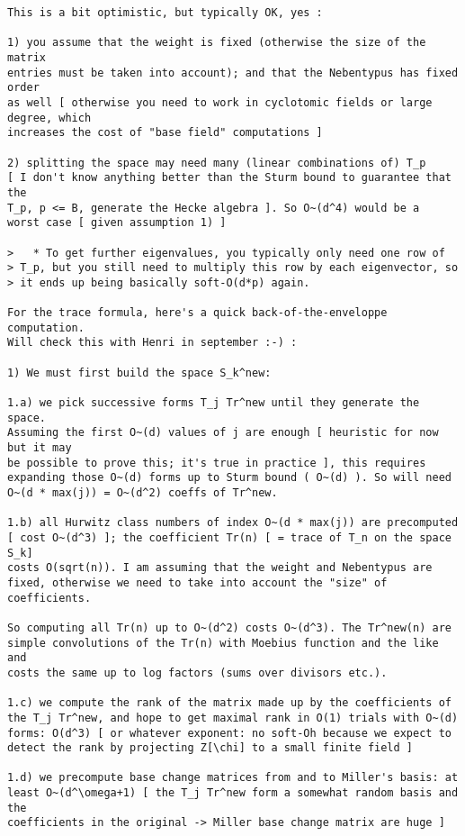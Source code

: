 \documentclass[11pt]{amsart}
\numberwithin{equation}{subsection}
\theoremstyle{plain}
\theoremstyle{definition}
\begin{document}
\begin{verbatim}
This is a bit optimistic, but typically OK, yes :

1) you assume that the weight is fixed (otherwise the size of the matrix
entries must be taken into account); and that the Nebentypus has fixed order
as well [ otherwise you need to work in cyclotomic fields or large degree, which
increases the cost of "base field" computations ]

2) splitting the space may need many (linear combinations of) T_p 
[ I don't know anything better than the Sturm bound to guarantee that the
T_p, p <= B, generate the Hecke algebra ]. So O~(d^4) would be a
worst case [ given assumption 1) ]

>   * To get further eigenvalues, you typically only need one row of
> T_p, but you still need to multiply this row by each eigenvector, so
> it ends up being basically soft-O(d*p) again.

For the trace formula, here's a quick back-of-the-enveloppe computation.
Will check this with Henri in september :-) :

1) We must first build the space S_k^new: 

1.a) we pick successive forms T_j Tr^new until they generate the space.
Assuming the first O~(d) values of j are enough [ heuristic for now but it may
be possible to prove this; it's true in practice ], this requires
expanding those O~(d) forms up to Sturm bound ( O~(d) ). So will need
O~(d * max(j)) = O~(d^2) coeffs of Tr^new.

1.b) all Hurwitz class numbers of index O~(d * max(j)) are precomputed
[ cost O~(d^3) ]; the coefficient Tr(n) [ = trace of T_n on the space S_k]
costs O(sqrt(n)). I am assuming that the weight and Nebentypus are
fixed, otherwise we need to take into account the "size" of coefficients.

So computing all Tr(n) up to O~(d^2) costs O~(d^3). The Tr^new(n) are
simple convolutions of the Tr(n) with Moebius function and the like and
costs the same up to log factors (sums over divisors etc.).

1.c) we compute the rank of the matrix made up by the coefficients of
the T_j Tr^new, and hope to get maximal rank in O(1) trials with O~(d)
forms: O(d^3) [ or whatever exponent: no soft-Oh because we expect to
detect the rank by projecting Z[\chi] to a small finite field ]

1.d) we precompute base change matrices from and to Miller's basis: at
least O~(d^\omega+1) [ the T_j Tr^new form a somewhat random basis and the
coefficients in the original -> Miller base change matrix are huge ]


\end{verbatim}
\end{document}

